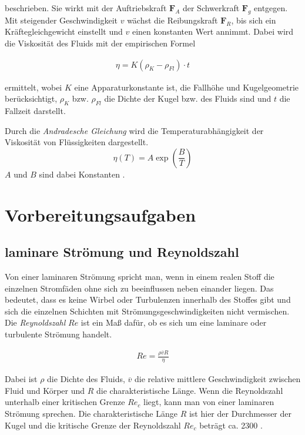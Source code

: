 beschrieben.
Sie wirkt mit der Auftriebskraft $\symbf{F}_A$ der Schwerkraft $\symbf{F}_g$ entgegen. 
Mit steigender Geschwindigkeit $v$ wächst die Reibungskraft $\symbf{F}_R$, bis sich ein Kräftegleichgewicht einstellt
und $v$ einen konstanten Wert annimmt.
Dabei wird die Viskosität des Fluids mit der empirischen Formel 

\begin{align}
    \label{eq:empirisch}
    \eta = K \left(\rho_K -\rho_{Fl}\right) \cdot t
\end{align}

ermittelt, wobei $K$ eine Apparaturkonstante ist, die Fallhöhe und Kugelgeometrie berücksichtigt,
$\rho_K$ bzw. $\rho_{Fl}$ die Dichte der Kugel bzw. des Fluids sind und $t$ die Fallzeit darstellt.


Durch die \textit{Andradesche Gleichung} wird die Temperaturabhängigkeit der Viskosität von Flüssigkeiten dargestellt.
\begin{equation}
\label{eq:andrade}
    \eta \left(T\right) = A \exp{\left(\frac{B}{T}\right)}
\end{equation}
$A$ und $B$ sind dabei Konstanten \cite*[]{va207}.



\section{Vorbereitungsaufgaben}
\subsection{laminare Strömung und Reynoldszahl}
\label{sec:vorbereitung}
Von einer laminaren Strömung spricht man, wenn in einem realen Stoff
die einzelnen Stromfäden ohne sich zu beeinflussen neben einander liegen. Das bedeutet, dass es keine Wirbel oder
Turbulenzen innerhalb des Stoffes gibt und sich die einzelnen Schichten mit Strömungsgeschwindigkeiten nicht vermischen.
Die \textit{Reynoldszahl} $Re$ ist ein Maß dafür, ob es sich um eine laminare oder turbulente Strömung handelt.

\begin{align}
    Re = \frac{\rho \overline{v} R}{\eta}
\end{align}

Dabei ist $\rho$ die Dichte des Fluids, $\overline{v}$ die relative mittlere Geschwindigkeit zwischen Fluid und Körper und
$R$ die charakteristische Länge.
Wenn die Reynoldszahl unterhalb einer kritischen Grenze $Re_c$ liegt, kann man von einer laminaren Strömung sprechen.
Die charakteristische Länge $R$ ist hier der Durchmesser der Kugel und die kritische Grenze der Reynoldszahl $Re_c$ beträgt ca. 2300 \cite*[]{geschke}.


